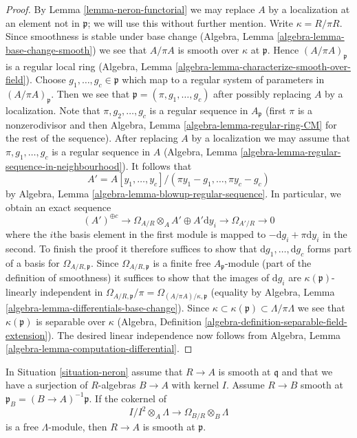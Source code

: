 \begin{proof}
By Lemma \ref{lemma-neron-functorial} we may replace $A$ by a localization
at an element not in $\mathfrak p$; we will use this without further mention.
Write $\kappa = R/\pi R$. Since smoothness is stable under base change
(Algebra, Lemma \ref{algebra-lemma-base-change-smooth})
we see that $A/\pi A$ is smooth over $\kappa$ at $\mathfrak p$.
Hence $(A/\pi A)_\mathfrak p$ is a regular local ring
(Algebra, Lemma \ref{algebra-lemma-characterize-smooth-over-field}).
Choose $g_1, \ldots, g_c \in \mathfrak p$ which map to
a regular system of parameters in $(A/\pi A)_\mathfrak p$.
Then we see that $\mathfrak p = (\pi, g_1, \ldots, g_c)$
after possibly replacing $A$ by a localization.
Note that $\pi, g_2, \ldots, g_c$ is a regular sequence
in $A_\mathfrak p$ (first $\pi$ is a nonzerodivisor and
then Algebra, Lemma \ref{algebra-lemma-regular-ring-CM}
for the rest of the sequence).
After replacing $A$ by a localization we may assume that
$\pi, g_1, \ldots, g_c$ is a regular sequence in $A$
(Algebra, Lemma \ref{algebra-lemma-regular-sequence-in-neighbourhood}).
It follows that
$$
A' = A[y_1, \ldots, y_c]/(\pi y_1 - g_1, \ldots, \pi y_c - g_c)
$$
by Algebra, Lemma \ref{algebra-lemma-blowup-regular-sequence}.
In particular, we obtain an exact sequence
$$
(A')^{\oplus c} \longrightarrow
\Omega_{A/R} \otimes_A A' \oplus
A' \text{d}y_i \longrightarrow
\Omega_{A'/R} \to 0
$$
where the $i$the basis element in the first module is mapped
to $- \text{d}g_i + \pi \text{d}y_i$ in the second. To finish the proof it
therefore suffices to show that $\text{d}g_1, \ldots, \text{d}g_c$
forms part of a basis for $\Omega_{A/R, \mathfrak p}$.
Since $\Omega_{A/R, \mathfrak p}$ is a finite free $A_\mathfrak p$-module
(part of the definition of smoothness) it suffices to show
that the images of $\text{d}g_i$ are $\kappa(\mathfrak p)$-linearly
independent in
$\Omega_{A/R, \mathfrak p}/\pi = \Omega_{(A/\pi A)/\kappa, \mathfrak p}$
(equality by Algebra, Lemma \ref{algebra-lemma-differentials-base-change}).
Since $\kappa \subset \kappa(\mathfrak p) \subset \Lambda/\pi \Lambda$
we see that $\kappa(\mathfrak p)$ is separable over $\kappa$
(Algebra, Definition \ref{algebra-definition-separable-field-extension}).
The desired linear independence now follows from
Algebra, Lemma \ref{algebra-lemma-computation-differential}.
\end{proof}

\begin{lemma}
\label{lemma-neron-when-smooth}
In Situation \ref{situation-neron} assume that $R \to A$ is smooth
at $\mathfrak q$ and that we have a surjection of $R$-algebras
$B \to A$ with kernel $I$. Assume $R \to B$ smooth at
$\mathfrak p_B = (B \to A)^{-1}\mathfrak p$. If the cokernel of
$$
I/I^2 \otimes_A \Lambda \to \Omega_{B/R} \otimes_B \Lambda
$$
is a free $\Lambda$-module, then $R \to A$ is smooth at $\mathfrak p$.
\end{lemma}

